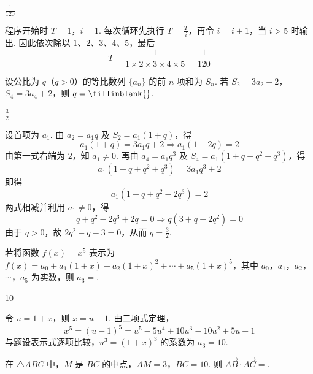 \begin{answer}
\(\frac{1}{120}\)
\end{answer}

\begin{solution}
程序开始时 \(T=1\)，\(i=1\). 每次循环先执行 \(T=\frac Ti\)，再令 \(i=i+1\)，当 \(i>5\) 时输出. 因此依次除以 \(1\)、\(2\)、\(3\)、\(4\)、\(5\)，最后
\[
T=\frac1{1\times2\times3\times4\times5}=\frac1{120}
\]
\end{solution}

\begin{problem}
设公比为 \(q\)（\(q>0\)）的等比数列 \(\{a_{n}\}\) 的前 \(n\) 项和为 \(S_{n}\). 若 \(S_{2} = 3a_{2} + 2\)，\(S_{4} = 3a_{4} + 2\)，则 \(q =\fillinblank{}\).
\end{problem}

\begin{answer}
\(\frac{3}{2}\)
\end{answer}

\begin{solution}
设首项为 \(a_1\). 由 \(a_2=a_1q\) 及 \(S_2=a_1(1+q)\)，得
\[
a_1(1+q)=3a_1q+2\Longrightarrow a_1(1-2q)=2
\]
由第一式右端为 \(2\)，知 \(a_1\ne0\). 再由 \(a_4=a_1q^3\) 及 \(S_4=a_1(1+q+q^2+q^3)\)，得
\[
a_1(1+q+q^2+q^3)=3a_1q^3+2
\]
即得
\[
a_1(1+q+q^2-2q^3)=2
\]
两式相减并利用 \(a_1\ne0\)，得
\[
q+q^2-2q^3+2q=0
\Longrightarrow q(3+q-2q^2)=0
\]
由于 \(q>0\)，故 \(2q^2-q-3=0\)，从而 \(q=\frac32\).
\end{solution}

\begin{problem}
若将函数 \( f(x) = x^5 \) 表示为 \( f(x) = a_0 + a_1(1 + x) + a_2(1 + x)^2 + \cdots + a_5(1 + x)^5 \)，其中 \(a_0\)，\(a_1\)，\(a_2\)，\(\cdots\)，\(a_5\) 为实数，则 \( a_3 = \)\fillinblank{}.
\end{problem}

\begin{answer}
10
\end{answer}

\begin{solution}
令 \(u=1+x\)，则 \(x=u-1\). 由二项式定理，
\[
x^5=(u-1)^5=u^5-5u^4+10u^3-10u^2+5u-1
\]
与题设表示式逐项比较，\(u^3=(1+x)^3\) 的系数为 \(a_3=10\).
\end{solution}

\begin{problem}
在 \(\triangle ABC\) 中，\(M\) 是 \(BC\) 的中点，\(AM = 3\)，\(BC = 10\). 则 \(\overrightarrow{AB} \cdot \overrightarrow{AC} =\)\fillinblank{}.
\end{problem}

